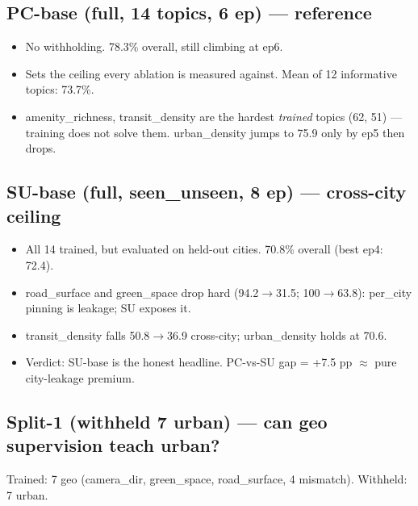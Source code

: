 \documentclass[11pt]{article}
\begin{document}
\subsection*{PC-base (full, 14 topics, 6 ep) --- reference}

\begin{itemize}\itemsep1pt
\item No withholding. 78.3\% overall, still climbing at ep6.
\item Sets the ceiling every ablation is measured against. Mean of 12 informative topics: 73.7\%.
\item amenity\_richness, transit\_density are the hardest \emph{trained} topics (62, 51) --- training does not solve them. urban\_density jumps to 75.9 only by ep5 then drops.
\end{itemize}

\subsection*{SU-base (full, seen\_unseen, 8 ep) --- cross-city ceiling}

\begin{itemize}\itemsep1pt
\item All 14 trained, but evaluated on held-out cities. 70.8\% overall (best ep4: 72.4).
\item road\_surface and green\_space drop hard (94.2$\to$31.5; 100$\to$63.8): per\_city pinning is leakage; SU exposes it.
\item transit\_density falls 50.8$\to$36.9 cross-city; urban\_density holds at 70.6.
\item Verdict: SU-base is the honest headline. PC-vs-SU gap = +7.5 pp $\approx$ pure city-leakage premium.
\end{itemize}

\subsection*{Split-1 (withheld 7 urban) --- can geo supervision teach urban?}

Trained: 7 geo (camera\_dir, green\_space, road\_surface, 4 mismatch). Withheld: 7 urban.
\end{document}
